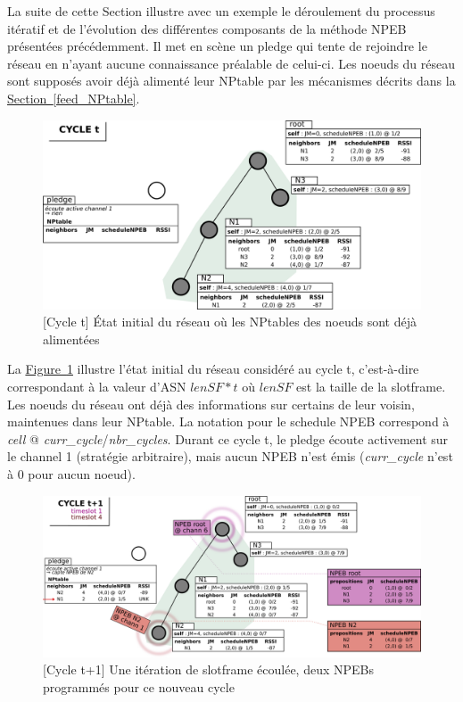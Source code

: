 \documentclass[]{report}
\newcommand{\wordlink}[2]{\hyperref[#2]{#1~\ref{#2}}}
\begin{document}
\newpage

La suite de cette Section illustre avec un exemple le déroulement du processus itératif et de l'évolution des différentes composants de la méthode NPEB présentées précédemment. Il met en scène un pledge qui tente de rejoindre le réseau en n'ayant aucune connaissance préalable de celui-ci. Les noeuds du réseau sont supposés avoir déjà alimenté leur NPtable par les mécanismes décrits dans la \wordlink{Section}{feed_NPtable}.

 \vspace{0.2cm}
	\begin{figure}[!h]
	\centering
	\includegraphics[width=0.85\linewidth]{NPEB_step1}
	\caption{[Cycle t] État initial du réseau où les NPtables des noeuds sont déjà alimentées}
	\label{fig:NPEB_step1}
	\end{figure}
\vspace{0.2cm}

La \wordlink{Figure}{fig:NPEB_step1} illustre l'état initial du réseau considéré au cycle t, c'est-à-dire correspondant à la valeur d'ASN $lenSF * t$ où $lenSF$ est la taille de la slotframe. Les noeuds du réseau ont déjà des informations sur certains de leur voisin, maintenues dans leur NPtable. La notation pour le schedule NPEB correspond à \textit{cell} @ \textit{curr\_cycle}/\textit{nbr\_cycles}. Durant ce cycle t, le pledge écoute activement sur le channel 1 (stratégie arbitraire), mais aucun NPEB n'est émis (\textit{curr\_cycle} n'est à 0 pour aucun noeud).

 \vspace{0.6cm}
	\begin{figure}[!h]
	\centering
	\includegraphics[width=\linewidth]{NPEB_step2}
	\caption{[Cycle t+1] Une itération de slotframe écoulée, deux NPEBs programmés pour ce nouveau cycle}
	\label{fig:NPEB_step2}
	\end{figure}
\vspace{0.2cm}
\end{document}
